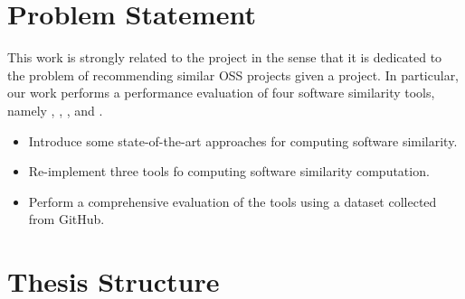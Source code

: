 \section{Problem Statement}

This work is strongly related to the \projectName project in the sense that it is dedicated to the problem of recommending similar OSS projects given a project. In particular, our work performs a performance evaluation of four software similarity tools, namely \MUDABlue \cite{10.1109/APSEC.2004.69}, \CLAN \cite{McMillan:2012:DSS:2337223.2337267}, \RepoPal \cite{10.1109/SANER.2017.7884605}, and \CrossSim \cite{NDRDSEAA2018}.


\begin{itemize}
	\item Introduce some state-of-the-art approaches for computing software similarity.	
	\item Re-implement three tools fo computing software similarity computation.
	\item Perform a comprehensive evaluation of the tools using a dataset collected from GitHub. %
\end{itemize}

\section{Thesis Structure}

